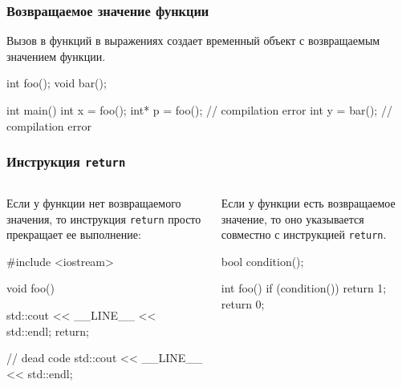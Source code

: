 \documentclass[compress, 8pt]{beamer}
\begin{document}
\begin{frame}[fragile]

    \frametitle{Возвращаемое значение функции}

    Вызов в функций в выражениях создает временный объект с возвращаемым
    значением функции.

    \begin{myinplacelisting}[minted language=cpp]
int foo();
void bar();

int main() {
    int x = foo();
    int* p = foo(); // compilation error
    int y = bar(); // compilation error
}
    \end{myinplacelisting}

\end{frame}

\begin{frame}[fragile]

    \frametitle{Инструкция \texttt{return}}

    \begin{columns}[T]

        \begin{column}{0.5\textwidth}

            Если у функции нет возвращаемого значения, то инструкция \verb|return|
            просто прекращает ее выполнение:

            \begin{myinplacelisting}[minted language=cpp]
#include <iostream>

void foo() {
    std::cout << __LINE__
        << std::endl;
    return;

    // dead code
    std::cout << __LINE__
        << std::endl;
}
            \end{myinplacelisting}

        \end{column}

        \begin{column}{0.5\textwidth}

            Если у функции есть возвращаемое значение, то оно указывается
            совместно с инструкцией \verb|return|.

            \begin{myinplacelisting}[minted language=cpp]
bool condition();

int foo() {
    if (condition()) {
        return 1;
    }
    return 0;
}
            \end{myinplacelisting}

        \end{column}

    \end{columns}

\end{frame}
\end{document}
